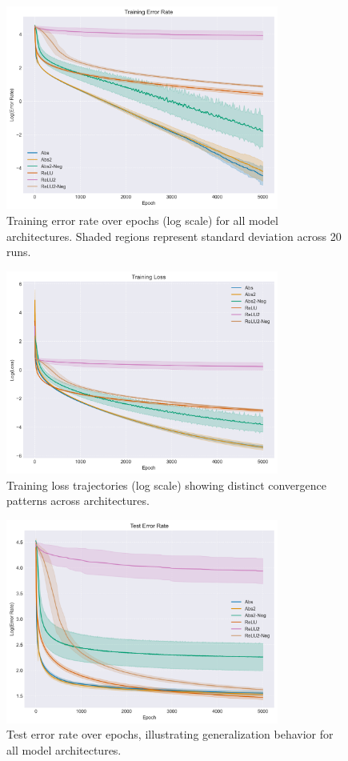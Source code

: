 \begin{figure}[ht]
\centering
\includegraphics[width=0.8\textwidth]{images/train_error.png}
\caption{Training error rate over epochs (log scale) for all model architectures. Shaded regions represent standard deviation across 20 runs.}
\label{fig:train_error}
\end{figure}

\begin{figure}[ht]
\centering
\includegraphics[width=0.8\textwidth]{images/train_loss.png}
\caption{Training loss trajectories (log scale) showing distinct convergence patterns across architectures.}
\label{fig:train_loss}
\end{figure}

\begin{figure}[ht]
\centering
\includegraphics[width=0.8\textwidth]{images/test_error.png}
\caption{Test error rate over epochs, illustrating generalization behavior for all model architectures.}
\label{fig:test_error}
\end{figure}

